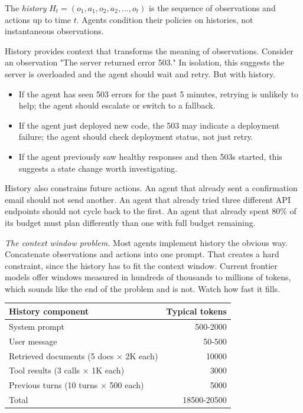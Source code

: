 The \emph{history} $H_t = (o_1, a_1, o_2, a_2, \ldots, o_t)$ is the sequence of observations and actions up to time $t$. Agents condition their policies on histories, not instantaneous observations.

History provides context that transforms the meaning of observations. Consider an observation "The server returned error 503." In isolation, this suggests the server is overloaded and the agent should wait and retry. But with history.

\begin{itemize}
\item If the agent has seen 503 errors for the past 5 minutes, retrying is unlikely to help; the agent should escalate or switch to a fallback.
\item If the agent just deployed new code, the 503 may indicate a deployment failure; the agent should check deployment status, not just retry.
\item If the agent previously saw healthy responses and then 503s started, this suggests a state change worth investigating.
\end{itemize}

History also constrains future actions. An agent that already sent a confirmation email should not send another. An agent that already tried three different API endpoints should not cycle back to the first. An agent that already spent 80\% of its budget must plan differently than one with full budget remaining.

\textit{The context window problem.} Most agents implement history the obvious way. Concatenate observations and actions into one prompt. That creates a hard constraint, since the history has to fit the context window. Current frontier models offer windows measured in hundreds of thousands to millions of tokens, which sounds like the end of the problem and is not. Watch how fast it fills.

\begin{center}
\begin{tabular}{lr}
\toprule
History component & Typical tokens \\
\midrule
System prompt & 500-2000 \\
User message & 50-500 \\
Retrieved documents (5 docs × 2K each) & 10000 \\
Tool results (3 calls × 1K each) & 3000 \\
Previous turns (10 turns × 500 each) & 5000 \\
\midrule
Total & 18500-20500 \\
\bottomrule
\end{tabular}
\end{center}

